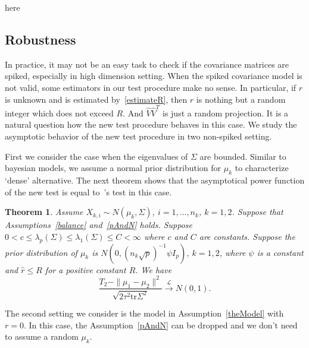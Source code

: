 \documentclass[review]{elsarticle}
\theoremstyle{plain}
\newtheorem{theorem}{\quad\quad Theorem}
\theoremstyle{definition}
\theoremstyle{remark}
\begin{document}
{\color{red} here}

\subsection{Robustness}
In practice, it may not be an easy task to check if the covariance matrices are spiked, especially in high dimension setting.
When the spiked covariance model is not valid,
some estimators in our test procedure make no sense.
In particular, if $r$ is unknown and is estimated by~\eqref{estimateR}, then $\hat{r}$ is nothing but a random integer which does not exceed $R$.
And $\hat{V}\hat{V}^T$ is just a random projection.
It is a natural question how the new test procedure behaves in this case.
We study the asymptotic behavior of the new test procedure in two non-spiked setting.

First we consider the case  when the eigenvalues of $\Sigma$ are bounded.
Similar to bayesian models, we assume a normal prior distribution for $\mu_k$ to characterize `dense' alternative.
The next theorem shows that the asymptotical power function of the new test is  equal to~\cite{Chen2010A}'s test in this case.


\begin{theorem}\label{sameTheorem}
   Assume $X_{k,i}\sim N(\mu_k,\Sigma)$,  $i=1,\ldots,n_k$, $k=1,2$.
    Suppose that Assumptions~\ref{balance} and~\ref{pAndN} holds. Suppose $0<c\leq\lambda_p(\Sigma)\leq\lambda_1(\Sigma)\leq C<\infty$ where $c$ and $C$ are constants.
    Suppose the prior distribution of $\mu_k$ is $N(0,{(n_k\sqrt{p})}^{-1}\psi I_p)$, $k=1,2$, where $\psi$ is a constant and  $\hat{r}\leq R$ for a positive constant $R$.
    We have
\begin{equation*}
    \frac{T_2-\|\mu_1-\mu_2\|^2}{\sqrt{2\tau^2 \mathrm{tr}\Sigma^2}} \xrightarrow{\mathcal{L}} N(0,1).
\end{equation*}
\end{theorem}

The second setting we consider is the model in Assumption~\ref{theModel} with $r=0$.
In this case, the Assumption~\ref{pAndN} can be dropped and we don't need to assume a random $\mu_k$.
\end{document}
